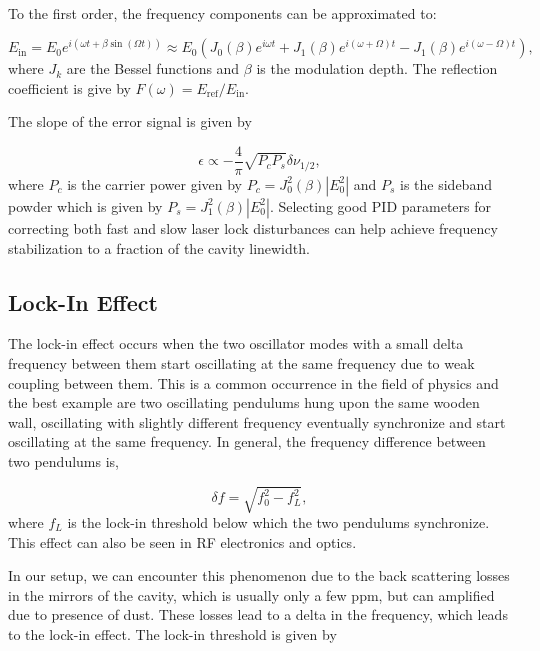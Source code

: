 \documentclass[a4paper]{report}
\numberwithin{equation}{section}
\begin{document}
To the first order, the frequency components can be approximated to: 

\begin{equation}
		E_{\mathrm{in}} = E_{0} e^{i \left(\omega t + \beta \sin(\Omega t) \right) } \approx E_{0} \left(J_{0} (\beta) e^{i \omega t } + J_{1}(\beta) e^{i(\omega + \Omega) t} - J_{1}(\beta) e^{i (\omega - \Omega)t} \right),
\end{equation}
where $J_{k}$ are the Bessel functions and $\beta$ is the modulation depth. The reflection coefficient is give by $F(\omega) = E_{\mathrm{ref}} / E_{\mathrm{in}}$.

The slope of the error signal is given by

\begin{equation}
		\epsilon \propto - \frac{4}{\pi} \sqrt{P_{c} P_{s}} \delta \nu _{1/2}, 
\end{equation}
where $P_{c}$ is the carrier power given by $P_{c} = J_{0}^2 (\beta) \left| E_{0}^2 \right| $ and $P_{s}$ is the sideband powder which is given by $P_{s} = J_{1}^2 (\beta) \left| E_{0}^2 \right| $.
Selecting good PID parameters for correcting both fast and slow laser lock disturbances can help achieve frequency stabilization to a fraction of the cavity linewidth. 

\subsection{Lock-In Effect} \label{sec:lockin_effect}
The lock-in effect occurs when the two oscillator modes with a small delta frequency between them start oscillating at the same frequency due to weak coupling between them. This is a common occurrence in the field of physics and the best example are two oscillating pendulums hung upon the same wooden wall, oscillating with slightly different frequency eventually synchronize and start oscillating at the same frequency. In general, the frequency difference between two pendulums is, 

\begin{equation}
		\delta f = \sqrt{f_{0}^2 - f_{L}^2},
\end{equation}
where $f_{L}$ is the lock-in threshold below which the two pendulums synchronize. This effect can also be seen in RF electronics and optics. 

In our setup, we can encounter this phenomenon due to the back scattering losses in the mirrors of the cavity, which is usually only a few ppm, but can amplified due to presence of dust. These losses lead to a delta in the frequency, which leads to the lock-in effect. The lock-in threshold is given by
\end{document}
